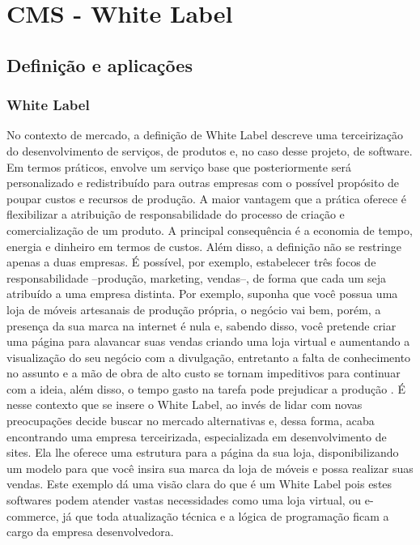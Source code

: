 
\chapter{CMS - White Label}
\label{chap:white-label}

\section{Definição e aplicações}
\subsection{White Label}

No contexto de mercado, a definição de White Label descreve uma terceirização do desenvolvimento de serviços, de produtos e, no caso desse projeto, de software. Em termos práticos, envolve um serviço base que posteriormente será personalizado e redistribuído para outras empresas com o possível propósito de poupar custos e recursos de produção. A maior vantagem que a prática oferece é flexibilizar a atribuição de responsabilidade do processo de criação e comercialização de um produto. A principal consequência é a economia de tempo, energia e dinheiro em termos de custos. Além disso, a definição não se restringe apenas a duas empresas. É possível, por exemplo, estabelecer três focos de responsabilidade –produção, marketing, vendas–, de forma que cada um seja atribuído a uma empresa distinta. Por exemplo, suponha que você possua uma loja de móveis artesanais de produção própria, o negócio vai bem, porém, a presença da sua marca na internet é nula e, sabendo disso, você pretende criar uma página para alavancar suas vendas criando uma loja virtual e aumentando a visualização do seu negócio com a divulgação, entretanto a falta de conhecimento no assunto e a mão de obra de alto custo se tornam impeditivos para continuar com a ideia, além disso, o tempo gasto na tarefa pode prejudicar a produção . É nesse contexto que se insere o White Label, ao invés de lidar com novas preocupações decide buscar no mercado alternativas e, dessa forma, acaba encontrando uma empresa terceirizada, especializada em desenvolvimento de sites. Ela lhe oferece uma estrutura para a página da sua loja, disponibilizando um modelo para que você insira sua marca da loja de móveis e possa realizar suas vendas. Este exemplo dá uma visão clara do que é um White Label pois estes softwares podem atender vastas necessidades como uma loja virtual, ou e-commerce, já que toda atualização técnica e a lógica de programação ficam a cargo da empresa desenvolvedora.

